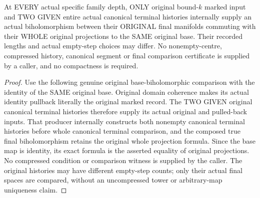 \begin{theorem}
\label{hir:original-terminal-histories-actual-choice-comparison}
\leanok
At EVERY actual specific family depth, ONLY original bound-$k$ marked
input and TWO GIVEN entire actual canonical terminal histories internally
supply an actual biholomorphism between their ORIGINAL final manifolds
commuting with their WHOLE original projections to the SAME original base.
Their recorded lengths and actual empty-step choices may differ. No
nonempty-centre, compressed history, canonical segment or final comparison
certificate is supplied by a caller, and no compactness is required.
\end{theorem}
\begin{proof}
Use the following genuine original base-biholomorphic comparison with the
identity of the SAME original base. Original domain coherence makes its
actual identity pullback literally the original marked record. The TWO
GIVEN original canonical terminal histories therefore supply its actual
original and pulled-back inputs. That producer internally constructs both
nonempty canonical terminal histories before whole canonical terminal
comparison, and the composed true final biholomorphism retains the original
whole projection formula. Since the base map is identity, its exact formula
is the asserted equality of original projections. No compressed condition
or comparison witness is supplied by the caller. The original histories
may have different empty-step counts; only their actual final spaces are
compared, without an uncompressed tower or arbitrary-map uniqueness claim.
\end{proof}

